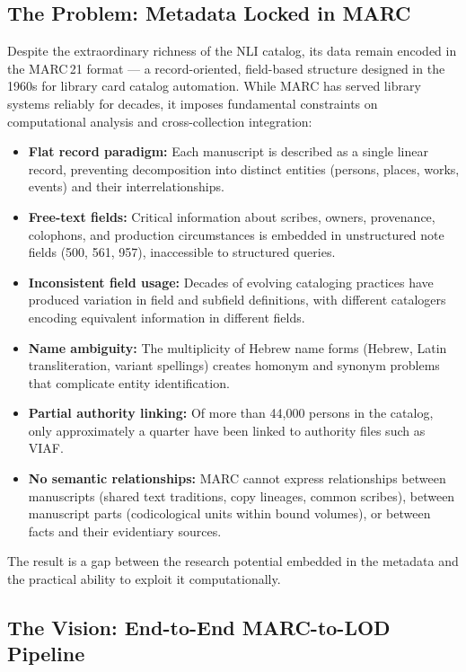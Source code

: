 \documentclass[12pt]{article}
\begin{document}
\subsection{The Problem: Metadata Locked in MARC}

Despite the extraordinary richness of the NLI catalog, its data remain encoded in the MARC\,21 format --- a record-oriented, field-based structure designed in the 1960s for library card catalog automation. While MARC has served library systems reliably for decades, it imposes fundamental constraints on computational analysis and cross-collection integration:

\begin{itemize}
\item \textbf{Flat record paradigm:} Each manuscript is described as a single linear record, preventing decomposition into distinct entities (persons, places, works, events) and their interrelationships.
\item \textbf{Free-text fields:} Critical information about scribes, owners, provenance, colophons, and production circumstances is embedded in unstructured note fields (500, 561, 957), inaccessible to structured queries.
\item \textbf{Inconsistent field usage:} Decades of evolving cataloging practices have produced variation in field and subfield definitions, with different catalogers encoding equivalent information in different fields.
\item \textbf{Name ambiguity:} The multiplicity of Hebrew name forms (Hebrew, Latin transliteration, variant spellings) creates homonym and synonym problems that complicate entity identification.
\item \textbf{Partial authority linking:} Of more than 44,000 persons in the catalog, only approximately a quarter have been linked to authority files such as VIAF.
\item \textbf{No semantic relationships:} MARC cannot express relationships between manuscripts (shared text traditions, copy lineages, common scribes), between manuscript parts (codicological units within bound volumes), or between facts and their evidentiary sources.
\end{itemize}

The result is a gap between the research potential embedded in the metadata and the practical ability to exploit it computationally.

\subsection{The Vision: End-to-End MARC-to-LOD Pipeline}
\end{document}
